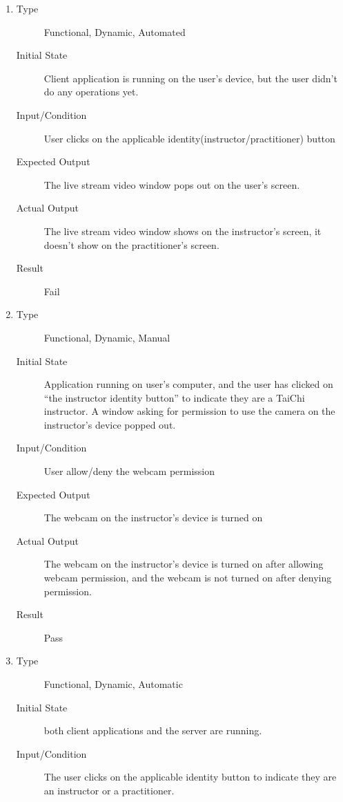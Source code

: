 \documentclass[12pt, titlepage]{article}
\begin{document}
\begin{enumerate}[FR-T1]
  \item \label{FRT1}
    \begin{description}
    \item[Type] Functional, Dynamic, Automated
    \item[Initial State] Client application is running on the user's device, but the
      user didn’t do any operations yet.
    \item[Input/Condition] User clicks on the applicable
      identity(instructor/practitioner) button
    \item[Expected Output] The live stream video window pops out on the user's screen.
    \item[Actual Output] The live stream video window shows on the instructor's screen, 
    it doesn't show on the practitioner's screen.
    \item[Result] Fail
    \end{description}
  \item \label{FRT2}
    \begin{description}
    \item[Type] Functional, Dynamic, Manual
    \item[Initial State] Application running on user’s computer, and the user has
      clicked on “the instructor identity button” to indicate they are a TaiChi
      instructor. A window asking for permission to use the camera on the
      instructor's device popped out.
    \item[Input/Condition] User allow/deny the webcam permission
    \item[Expected Output] The webcam on the instructor’s device is turned on
    \item[Actual Output] The webcam on the instructor’s device is turned on after 
    allowing webcam permission, and the webcam is not turned on after denying permission.
    \item[Result] Pass
    \end{description}
  \item \label{FRT3}
    \begin{description}
    \item[Type] Functional, Dynamic, Automatic
    \item[Initial State] both client applications and the server are running.
    \item[Input/Condition] The user clicks on the applicable identity button to
      indicate they are an instructor or a practitioner.

\end{description}
\end{enumerate}
\end{document}
